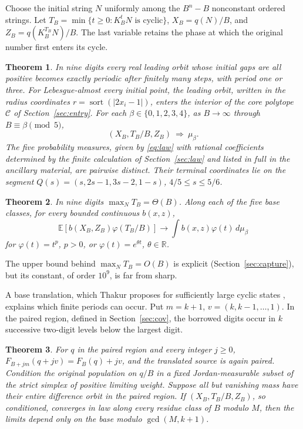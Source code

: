 \documentclass[11pt,reqno]{amsart}
\newtheorem{theorem}{Theorem}
\newcommand{\sort}{\operatorname{sort}}
\newcommand{\RR}{\mathbb R}
\begin{document}
Choose the initial string $N$ uniformly among the $B^n-B$ nonconstant
ordered strings. Let $T_B=\min\{t\ge0:K_B^tN\text{ is cyclic}\}$,
$X_B=q(N)/B$, and $Z_B=q(K_B^{T_B}N)/B$. The last variable retains the
phase at which the original number first enters its cycle.
\begin{theorem}\label{th:nine}
In nine digits every real leading orbit whose initial gaps are all positive
becomes exactly periodic after finitely many steps, with period one or three.
For Lebesgue-almost every initial point, the leading orbit, written in the
radius coordinates $r=\sort(|2x_i-1|)$, enters the interior of the core
polytope $\mathcal C$ of Section~\ref{sec:entry}.
For each $\beta\in\{0,1,2,3,4\}$, as $B\to\infty$ through $B\equiv\beta\pmod5$,
\[
 (X_B,T_B/B,Z_B)\ \Longrightarrow\ \mu_\beta .
\]
The five probability measures, given by \eqref{eq:law} with rational coefficients determined by the finite calculation of Section~\ref{sec:law} and listed in full in the ancillary material, are pairwise distinct.
Their terminal coordinates lie on the segment
$Q(s)=(s,2s-1,3s-2,1-s)$, $4/5\le s\le5/6$.
\end{theorem}
\begin{theorem}\label{th:clock}
In nine digits $\max_N T_B=\Theta(B)$. Along each of the five base classes,
for every bounded continuous $b(x,z)$,
\[\mathbb E[b(X_B,Z_B)\varphi(T_B/B)]\longrightarrow \int b(x,z)\varphi(t)\,d\mu_\beta\]
for
$\varphi(t)=t^p$, $p>0$, or $\varphi(t)=e^{\theta t}$, $\theta\in\RR$.
\end{theorem}
The upper bound behind $\max_N T_B=O(B)$ is explicit
(Section~\ref{sec:capture}), but its constant, of order $10^9$, is far
from sharp.

A base translation, which Thakur proposes for sufficiently large cyclic states \cite[Remark~4.3]{thakur}, explains which finite periods can occur. Put $m=k+1$,
$v=(k,k-1,\ldots,1)$. In the paired region, defined in
Section~\ref{sec:cov}, the borrowed digits occur in $k$ successive
two-digit levels below the largest digit.
\begin{theorem}\label{th:cov}
For $q$ in the paired region and every integer $j\ge0$,
$F_{B+jm}(q+jv)=F_B(q)+jv$, and the translated source is again paired.
Condition the original population on $q/B$ in a fixed Jordan-measurable
subset of the strict simplex of positive limiting weight. Suppose all but
vanishing mass have their entire difference orbit in the paired region.
If $(X_B,T_B/B,Z_B)$, so conditioned, converges in law along every residue
class of $B$ modulo $M$, then the limits depend only on the base modulo
$\gcd(M,k+1)$.
\end{theorem}
\end{document}
